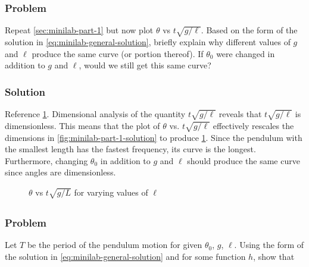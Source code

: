 \documentclass[12pt]{article}
\begin{document}
  \subsubsection*{Problem}
  Repeat \cref{sec:minilab-part-1} but now plot $\theta$ vs $t\sqrt{g/\ell}$.
  Based on the form of the solution in \cref{eq:minilab-general-solution},
  briefly explain why different values of $g$ and $\ell$ produce the same curve
  (or portion thereof). If $\theta_0$ were changed in addition to $g$ and
  $\ell$, would we still get this same curve?

  \subsubsection*{Solution}
  Reference \cref{fig:minilab-part-2-solution}. Dimensional analysis of the quantity
  $t\sqrt{g/\ell}$ reveals that $t\sqrt{g/\ell}$ is dimensionless. This means
  that the plot of $\theta$ vs. $t\sqrt{g/\ell}$ effectively rescales the
  dimensions in \cref{fig:minilab-part-1-solution} to produce \cref{fig:minilab-part-2-solution}.
  Since the pendulum with the smallest length has the fastest frequency, its
  curve is the longest. Furthermore, changing $\theta_0$ in addition to $g$ and
  $\ell$ should produce the same curve since angles are dimensionless.

  \begin{figure}
    \centering
    \caption{$\theta$ vs $t\sqrt{g/L}$ for varying values of $\ell$}
\label{fig:minilab-part-2-solution}
  \end{figure}

\subsection{}
  \subsubsection*{Problem}
  Let $T$ be the period of the pendulum motion for given $\theta_0$, $g$,
  $\ell$. Using the form of the solution in \cref{eq:minilab-general-solution}
  and for some function $h$, show that
\end{document}
